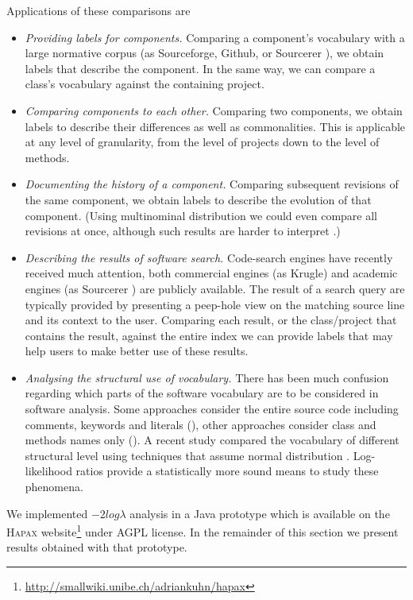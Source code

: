 Applications of these comparisons are
\begin{itemize}
\item \emph{Providing labels for components.} Comparing a component's vocabulary with a large normative corpus (as \eg Sourceforge, Github, or Sourcerer \cite{Bajrach09SUITE}), we obtain labels that describe the component. In the same way, we can compare a class's vocabulary against the containing project.
\item \emph{Comparing components to each other.} Comparing two components, we obtain labels to describe their differences as well as commonalities. This is applicable at any level of granularity, from the level of projects down to the level of methods.
\item \emph{Documenting the history of a component.} Comparing subsequent revisions of the same component, we obtain labels to describe the evolution of that component. (Using multinominal distribution we could even compare all revisions at once, although such results are harder to interpret \cite{Dunning}.)
\item \emph{Describing the results of software search.} Code-search engines have recently received much attention, both commercial engines (as \eg Krugle) and academic engines (as \eg Sourcerer \cite{Bajrach09SUITE}) are publicly available. The result of a search query are typically provided by presenting a peep-hole view on the matching source line and its context to the user. Comparing each result, or the class/project that contains the result, against the entire index we can provide labels that may help users to make better use of these results.
\item \emph{Analysing the structural use of vocabulary.} There has been much confusion regarding which parts of the software vocabulary are to be considered in software analysis. Some approaches consider the entire source code including comments, keywords and literals (\eg \cite{Kuhn08b,Kuhn07a}), other approaches consider class and methods names only (\eg \cite{Baldi08OOPSLA,EinarHoest}). A recent study compared the vocabulary of different structural level using techniques that assume normal distribution \cite{Linstead09SUITE}. Log-likelihood ratios provide a statistically more sound means to study these phenomena.
\end{itemize}

\noindent We implemented $-2log\lambda$ analysis in a Java prototype which is available on the \textsc{Hapax} website\footnote{\url{http://smallwiki.unibe.ch/adriankuhn/hapax}} under AGPL license. In the remainder of this section we present results obtained with that prototype.

